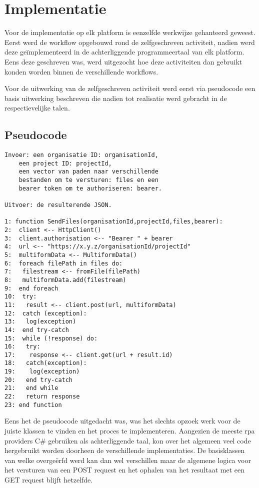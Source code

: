 \section{Implementatie}
Voor de implementatie op elk platform is eenzelfde werkwijze gehanteerd geweest. Eerst werd de workflow opgebouwd rond de zelfgeschreven activiteit, nadien werd deze geïmplementeerd in de achterliggende programmeertaal van elk platform. Eens deze geschreven was, werd uitgezocht hoe deze activiteiten dan gebruikt konden worden binnen de verschillende workflows.

Voor de uitwerking van de zelfgeschreven activiteit werd eerst via pseudocode een basis uitwerking beschreven die nadien tot realisatie werd gebracht in de respectievelijke talen.

\subsection{Pseudocode}
\begin{lstlisting}
Invoer: een organisatie ID: organisationId, 
	een project ID: projectId,
	een vector van paden naar verschillende 
	bestanden om te versturen: files en een 
	bearer token om te authoriseren: bearer.
	
Uitvoer: de resulterende JSON.

1: function SendFiles(organisationId,projectId,files,bearer):
2:  client <-- HttpClient()
3:  client.authorisation <-- "Bearer " + bearer
4:  url <-- "https://x.y.z/organisationId/projectId"
5:  multiformData <-- MultiformData()
6:  foreach filePath in files do:
7:   filestream <-- fromFile(filePath)
8:   multiformData.add(filestream)
9:  end foreach
10:  try:
11:   result <-- client.post(url, multiformData)
12:  catch (exception):
13:   log(exception)
14:  end try-catch
15:  while (!response) do:
16:   try:
17:    response <-- client.get(url + result.id)
18:   catch(exception):
19:    log(exception)
20:   end try-catch
21:   end while
22:   return response
23: end function
\end{lstlisting}

Eens het de pseudocode uitgedacht was, was het slechts opzoek werk voor de juiste klassen te vinden en het proces te implementeren. Aangezien de meeste \acrshort{rpa} providers C\# gebruiken als achterliggende taal, kon over het algemeen veel code hergebruikt worden doorheen de verschillende implementaties. De basisklassen van welke overgeërfd werd kan dan wel verschillen maar de algemene logica voor het versturen van een POST request en het ophalen van het resultaat met een GET request blijft hetzelfde.

